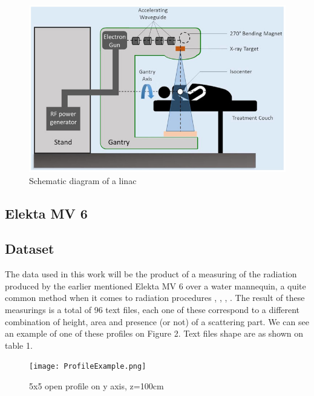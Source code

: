 \documentclass[openany]{article}
\begin{document}
\begin{figure}[!h]
    \centering
    \includegraphics[width=\textwidth]{fcvm-07-00108-g0003.jpg}
    \caption{Schematic diagram of a linac \cite{Jumeau}}
    \label{fig:my_label}
\end{figure}





\subsection{Elekta MV 6}


\subsection{Dataset}

The data used in this work will be the product of a measuring of the radiation produced by the earlier mentioned Elekta MV 6 over a water mannequin, a quite common method when it comes to radiation procedures \cite{Lutz1984-ex}, \cite{BenitesR2012}, \cite{Gonzalez2015}, \cite{Tessonnier} . The result of these measurings is a total of 96 text files, each one of these correspond to a different combination of height, area and presence (or not) of a scattering part. We can see an example of one of these profiles on Figure 2. Text files shape are as shown on table 1.


\begin{figure}[!h]
    \centering
    \texttt{[image: ProfileExample.png]}
    \caption{5x5 open profile on y axis, z=100cm}
    \label{fig:my_label}
\end{figure}
\end{document}
